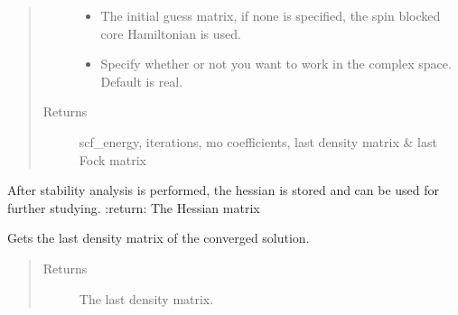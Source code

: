 \documentclass[letterpaper,10pt,english]{sphinxmanual}
\begin{document}
\begin{fulllineitems}
\begin{fulllineitems}
\begin{quote}
\begin{description}
\begin{itemize}
\item {} 
 \textendash{} The initial guess matrix, if none is specified, the spin blocked core Hamiltonian is used.

\item {} 
 \textendash{} Specify whether or not you want to work in the complex space. Default is real.

\end{itemize}

\item[{Returns}] \leavevmode
scf\_energy, iterations, mo coefficients, last density matrix \& last Fock matrix

\end{description}\end{quote}

\end{fulllineitems}


\begin{fulllineitems}
\label{\detokenize{GHF:hf.HartreeFock.GHF.MF.get_hessian}}
After stability analysis is performed, the hessian is stored and can be used for further studying.
:return: The Hessian matrix

\end{fulllineitems}


\begin{fulllineitems}
\label{\detokenize{GHF:hf.HartreeFock.GHF.MF.get_last_dens}}
Gets the last density matrix of the converged solution.
\begin{quote}\begin{description}
\item[{Returns}] \leavevmode
The last density matrix.

\end{description}\end{quote}

\end{fulllineitems}



\end{fulllineitems}
\end{document}
